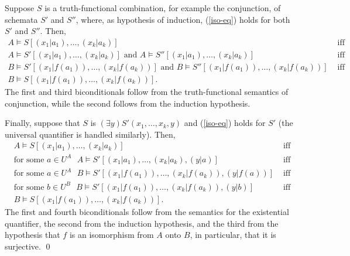 Suppose $S$ is a truth-functional combination, for example the conjunction, of schemata $S'$ and $S''$, where, as hypothesis of induction, (\ref{iso-eq}) holds for both $S'$ and $S''$. Then,
\[
\begin{array}{lc}
A\models S[(x_1|a_1),\ldots,(x_k|a_k)] & \mbox{ iff}\\
A\models S'[(x_1|a_1),\ldots,(x_k|a_k)]\mbox{ and }A\models S''[(x_1|a_1),\ldots,(x_k|a_k)] & \mbox{ iff}\\
B\models S'[(x_1|f(a_1)),\ldots,(x_k|f(a_k))]\mbox{ and }B\models S''[(x_1|f(a_1)),\ldots,(x_k|f(a_k))] & \mbox{ iff}\\
B\models S[(x_1|f(a_1)),\ldots,(x_k|f(a_k))].
\end{array}
\]
The first and third biconditionals follow from the truth-functional semantics of conjunction, while the second follows from the induction hypothesis.

Finally, suppose that $S$ is $(\exists y)S'(x_1,\ldots,x_k,y)$ and (\ref{iso-eq}) holds for $S'$ (the universal quantifier is handled similarly). Then,
\[
\begin{array}{lc}
A\models S[(x_1|a_1),\ldots,(x_k|a_k)] & \mbox{ iff}\\
\mbox{for some $a\in U^A$ }
A\models S'[(x_1|a_1),\ldots,(x_k|a_k),(y|a)] & \mbox{ iff}\\
\mbox{for some $a\in U^A$ }
B\models S'[(x_1|f(a_1)),\ldots,(x_k|f(a_k)),(y|f(a))] & \mbox{ iff}\\
\mbox{for some $b\in U^B$ }
B\models S'[(x_1|f(a_1)),\ldots,(x_k|f(a_k)),(y|b)] & \mbox{ iff}\\
B\models S[(x_1|f(a_1)),\ldots,(x_k|f(a_k))].
\end{array}
\]
The first and fourth biconditionals follow from the semantics for the existential quantifier, the second from the induction hypothesis, and the third from the hypothesis that $f$ is an isomorphism from $A$ onto $B$, in particular, that it is
surjective. \qed 


